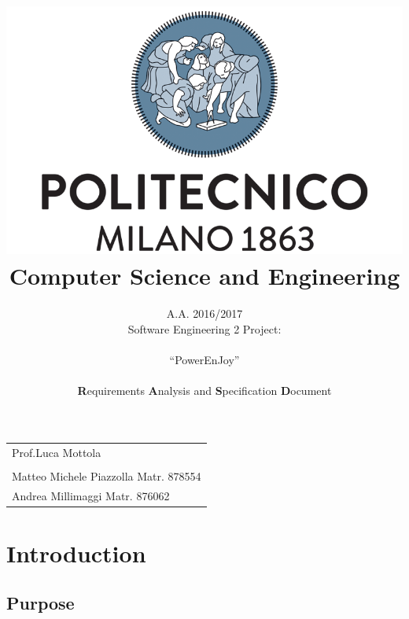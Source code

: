 \documentclass[english]{article}
\newcommand{\lyxrightaddress}[1]{
\par {\raggedleft \begin{tabular}{l}\ignorespaces
#1
\end{tabular}
\vspace{1.4em}
\par}
}
\begin{document}
\title{\includegraphics[scale=0.4]{img/polimi}\\
Computer Science and Engineering}

\begin{doublespace}

\author{A.A. 2016/2017\\
Software Engineering 2 Project: \\
\\
{\LARGE{}``PowerEnJoy''}\textbf{}\\
\\
\textbf{R}equirements \textbf{A}nalysis and \textbf{S}pecification
\textbf{D}ocument\\
}
\end{doublespace}

\maketitle

\lyxrightaddress{Prof.Luca Mottola\\
\\
Matteo Michele Piazzolla Matr. 878554\\
Andrea Millimaggi Matr. 876062}

\newpage{}
\listoftodos
\newpage{}

\tableofcontents{}

\newpage{}
\listoffigures

\newpage{}

\section{Introduction}


\subsection{Purpose}
\end{document}
